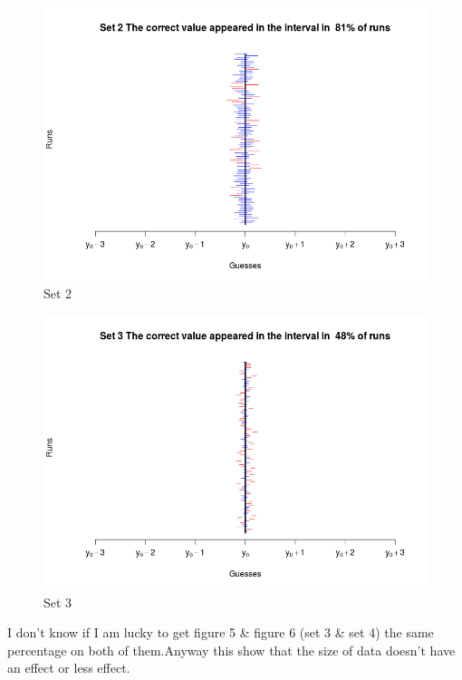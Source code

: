 \documentclass{article}
\begin{document}
\begin{multicols*}{2}
\begin{flushleft}
\begin{flushleft}
\begin{figure}[H]
	\begin{center}
		\includegraphics[scale=0.3]{plotset2.png}
	\end{center}
	\caption{Set 2 }
\end{figure}
\begin{figure}[H]
	\begin{center}
		\includegraphics[scale=0.3]{plotset3.png}
	\end{center}
	\caption{Set 3 }
\end{figure}
I don't know if I am lucky to get figure 5 \& figure 6 (set 3 \& set 4) the same percentage on both of them.Anyway this show that the size of data doesn't have an effect or less effect.
\begin{figure}[H]
	\begin{center}

\end{center}
\end{figure}
\end{flushleft}
\end{flushleft}
\end{multicols*}
\end{document}

